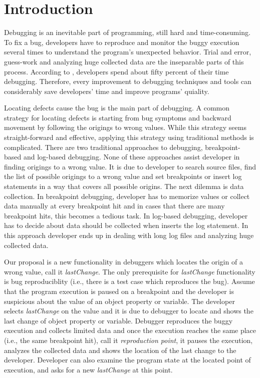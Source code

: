 \documentclass[preprint]{sigplanconf}
\begin{document}
\section{Introduction}
Debugging is an inevitable part of programming, still hard and time-consuming. To fix a bug, developers have to reproduce and monitor the buggy execution several times to understand the program's unexpected behavior. Trial and error, guess-work and analyzing huge collected data are the inseparable parts of this process. According to \cite{LaToza}, developers spend about fifty percent of their time debugging. Therefore, every improvement to debugging techniques and tools can considerably save developers' time and improve programs' quiality.

Locating defects cause the bug is the main part of debugging. A common strategy for locating defects is starting from bug symptoms and backward movement by following the origings to wrong values. While this strategy seems straight-forward and effective, applying this strategy using traditional methods is complicated. There are two traditional approaches to debugging, breakpoint-based and log-based debugging. None of these approaches assist developer in finding origings to a wrong value. It is due to developer to search source files, find the list of possible origings to a wrong value and set breakpoints or insert log statements in a way that covers all possible origins.
The next dilemma is data collection. In breakpoint debugging, developer has to memorize values or collect data manually at every breakpoint hit and in cases that there are many breakpoint hits, this becomes a tedious task. In log-based debugging, developer has to decide about data should be collected when inserts the log statement. In this approach developer ends up in dealing with long log files and analyzing huge collected data.

Our proposal is a new functionality in debuggers which locates the origin of a wrong value, call it \textit{lastChange}. The only prerequisite for \textit{lastChange} functionality is bug reproduciblity (i.e., there is a test case which reproduces the bug). Assume that the program execution is paused on a breakpoint and the developer is suspicious about the value of an object property or variable. The developer selects \textit{lastChange} on the value and it is due to debugger to locate and shows the last change of object property or variable. Debugger reproduces the buggy execution and collects limited data and once the execution reaches the same place (i.e., the same breakpoint hit), call it \textit{reproduction point}, it pauses the execution, analyzes the collected data and shows the location of the last change to the developer. Developer can also examine the program state at the located point of execution, and asks for a new \textit{lastChange} at this point.
\end{document}
